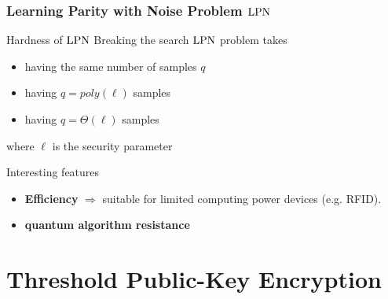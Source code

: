 \begin{frame}
 \frametitle{Learning Parity with Noise Problem $\mathrm{LPN}$}

  \begin{block}{Hardness of $\mathrm{LPN}$}
  Breaking the search $\mathrm{LPN}$ problem takes
  



   \begin{itemize}
    \item {} having the same number of samples $q$
    \item {} having $q=poly(\ell)$ samples
    \item {} having $q= \mathcal{\varTheta}(\ell)$ samples
   \end{itemize} 
where $\ell$ is the security parameter
  \end{block}

  \begin{block}{Interesting features}
    \begin{itemize}
      \item \textbf{Efficiency} $\Rightarrow$ suitable for limited computing power devices (e.g. RFID).
      \item \textbf{quantum algorithm resistance}
    \end{itemize}
  \end{block}

\end{frame}

\section{Threshold Public-Key Encryption}

